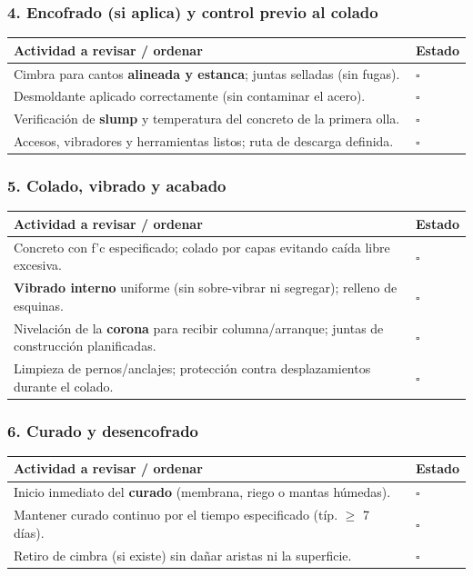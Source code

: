 \documentclass[12pt]{article}
\newcommand{\cbox}{\(\square\)} %
\begin{document}
	\subsubsection*{4. Encofrado (si aplica) y control previo al colado}
	\begin{tabularx}{\linewidth}{>{\raggedright\arraybackslash}p{0.93\linewidth} >{\centering\arraybackslash}m{0.07\linewidth}}
		\toprule
		\textbf{Actividad a revisar / ordenar} & \textbf{Estado}\\
		\midrule
		Cimbra para cantos \textbf{alineada y estanca}; juntas selladas (sin fugas). & \cbox \\
		Desmoldante aplicado correctamente (sin contaminar el acero). & \cbox \\
		Verificación de \textbf{slump} y temperatura del concreto de la primera olla. & \cbox \\
		Accesos, vibradores y herramientas listos; ruta de descarga definida. & \cbox \\
		\bottomrule
	\end{tabularx}
	
	\subsubsection*{5. Colado, vibrado y acabado}
	\begin{tabularx}{\linewidth}{>{\raggedright\arraybackslash}p{0.93\linewidth} >{\centering\arraybackslash}m{0.07\linewidth}}
		\toprule
		\textbf{Actividad a revisar / ordenar} & \textbf{Estado}\\
		\midrule
		Concreto con f’c especificado; colado por capas evitando caída libre excesiva. & \cbox \\
		\textbf{Vibrado interno} uniforme (sin sobre-vibrar ni segregar); relleno de esquinas. & \cbox \\
		Nivelación de la \textbf{corona} para recibir columna/arranque; juntas de construcción planificadas. & \cbox \\
		Limpieza de pernos/anclajes; protección contra desplazamientos durante el colado. & \cbox \\
		\bottomrule
	\end{tabularx}
	
	\subsubsection*{6. Curado y desencofrado}
	\begin{tabularx}{\linewidth}{>{\raggedright\arraybackslash}p{0.93\linewidth} >{\centering\arraybackslash}m{0.07\linewidth}}
		\toprule
		\textbf{Actividad a revisar / ordenar} & \textbf{Estado}\\
		\midrule
		Inicio inmediato del \textbf{curado} (membrana, riego o mantas húmedas). & \cbox \\
		Mantener curado continuo por el tiempo especificado (típ. \(\geq\) 7 días). & \cbox \\
		Retiro de cimbra (si existe) sin dañar aristas ni la superficie. & \cbox \\
		\bottomrule
	\end{tabularx}
	
\end{document}

